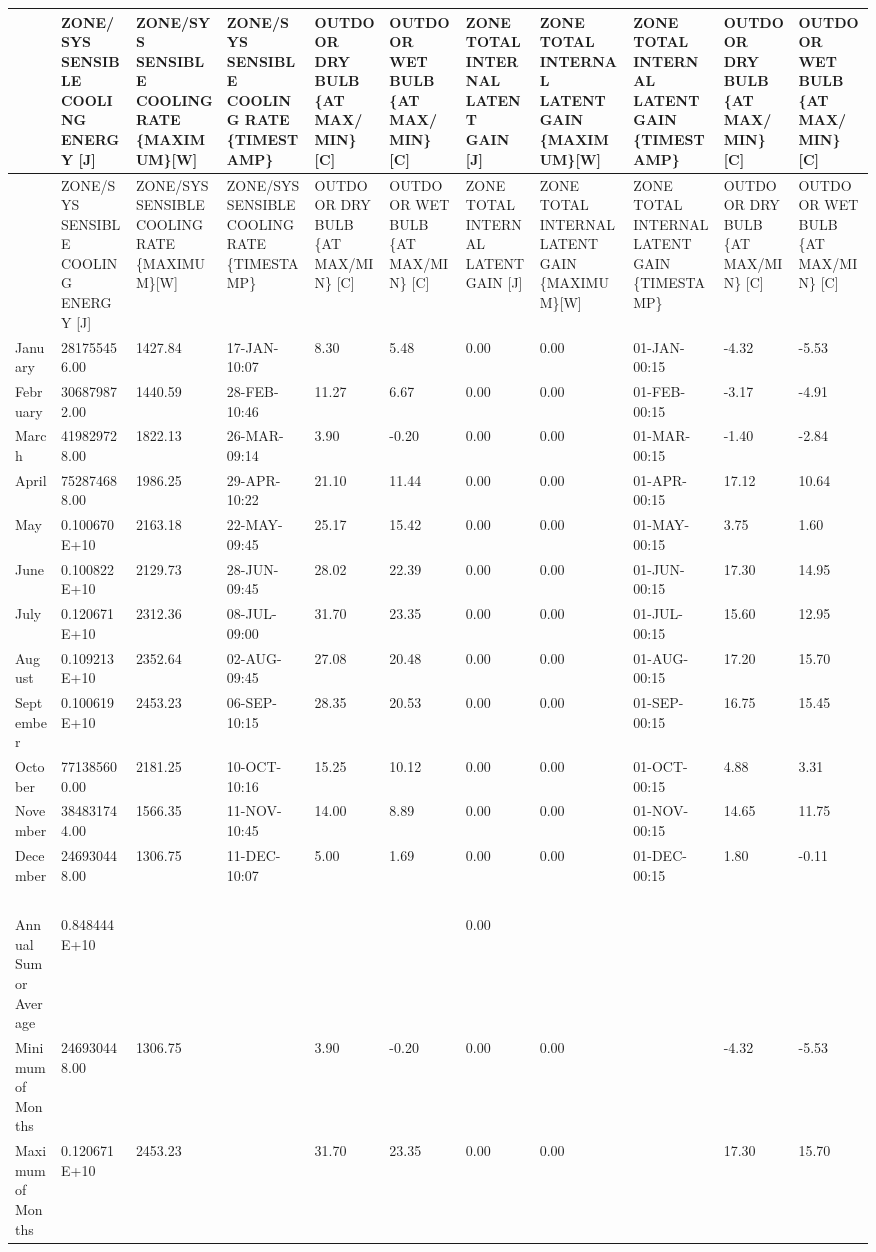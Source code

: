 {\tiny
\begin{longtable}[c]{>{\raggedright}p{0.54in}>{\raggedright}p{0.54in}>{\raggedright}p{0.54in}>{\raggedright}p{0.54in}>{\raggedright}p{0.54in}>{\raggedright}p{0.54in}>{\raggedright}p{0.54in}>{\raggedright}p{0.54in}>{\raggedright}p{0.54in}>{\raggedright}p{0.54in}>{\raggedright}p{0.54in}}
\toprule 
~ & ZONE/SYS SENSIBLE COOLING ENERGY [J] & ZONE/SYS SENSIBLE COOLING RATE \{MAXIMUM\}[W] & ZONE/SYS SENSIBLE COOLING RATE \{TIMESTAMP\} & OUTDOOR DRY BULB \{AT MAX/MIN\} [C] & OUTDOOR WET BULB \{AT MAX/MIN\} [C] & ZONE TOTAL INTERNAL LATENT GAIN [J] & ZONE TOTAL INTERNAL LATENT GAIN \{MAXIMUM\}[W] & ZONE TOTAL INTERNAL LATENT GAIN \{TIMESTAMP\} & OUTDOOR DRY BULB \{AT MAX/MIN\} [C] & OUTDOOR WET BULB \{AT MAX/MIN\} [C] \tabularnewline
\midrule
\endfirsthead

\toprule 
~ & ZONE/SYS SENSIBLE COOLING ENERGY [J] & ZONE/SYS SENSIBLE COOLING RATE \{MAXIMUM\}[W] & ZONE/SYS SENSIBLE COOLING RATE \{TIMESTAMP\} & OUTDOOR DRY BULB \{AT MAX/MIN\} [C] & OUTDOOR WET BULB \{AT MAX/MIN\} [C] & ZONE TOTAL INTERNAL LATENT GAIN [J] & ZONE TOTAL INTERNAL LATENT GAIN \{MAXIMUM\}[W] & ZONE TOTAL INTERNAL LATENT GAIN \{TIMESTAMP\} & OUTDOOR DRY BULB \{AT MAX/MIN\} [C] & OUTDOOR WET BULB \{AT MAX/MIN\} [C] \tabularnewline
\midrule
\endhead

January & 281755456.00 & 1427.84 & 17-JAN-10:07 & 8.30 & 5.48 & 0.00 & 0.00 & 01-JAN-00:15 & -4.32 & -5.53 \tabularnewline
February & 306879872.00 & 1440.59 & 28-FEB-10:46 & 11.27 & 6.67 & 0.00 & 0.00 & 01-FEB-00:15 & -3.17 & -4.91 \tabularnewline
March & 419829728.00 & 1822.13 & 26-MAR-09:14 & 3.90 & -0.20 & 0.00 & 0.00 & 01-MAR-00:15 & -1.40 & -2.84 \tabularnewline
April & 752874688.00 & 1986.25 & 29-APR-10:22 & 21.10 & 11.44 & 0.00 & 0.00 & 01-APR-00:15 & 17.12 & 10.64 \tabularnewline
May & 0.100670E+10 & 2163.18 & 22-MAY-09:45 & 25.17 & 15.42 & 0.00 & 0.00 & 01-MAY-00:15 & 3.75 & 1.60 \tabularnewline
June & 0.100822E+10 & 2129.73 & 28-JUN-09:45 & 28.02 & 22.39 & 0.00 & 0.00 & 01-JUN-00:15 & 17.30 & 14.95 \tabularnewline
July & 0.120671E+10 & 2312.36 & 08-JUL-09:00 & 31.70 & 23.35 & 0.00 & 0.00 & 01-JUL-00:15 & 15.60 & 12.95 \tabularnewline
August & 0.109213E+10 & 2352.64 & 02-AUG-09:45 & 27.08 & 20.48 & 0.00 & 0.00 & 01-AUG-00:15 & 17.20 & 15.70 \tabularnewline
September & 0.100619E+10 & 2453.23 & 06-SEP-10:15 & 28.35 & 20.53 & 0.00 & 0.00 & 01-SEP-00:15 & 16.75 & 15.45 \tabularnewline
October & 771385600.00 & 2181.25 & 10-OCT-10:16 & 15.25 & 10.12 & 0.00 & 0.00 & 01-OCT-00:15 & 4.88 & 3.31 \tabularnewline
November & 384831744.00 & 1566.35 & 11-NOV-10:45 & 14.00 & 8.89 & 0.00 & 0.00 & 01-NOV-00:15 & 14.65 & 11.75 \tabularnewline
December & 246930448.00 & 1306.75 & 11-DEC-10:07 & 5.00 & 1.69 & 0.00 & 0.00 & 01-DEC-00:15 & 1.80 & -0.11 \tabularnewline
~ & ~ & ~ & ~ & ~ & ~ & ~ & ~ & ~ & ~ & ~ \tabularnewline
Annual Sum or Average & 0.848444E+10 & ~ & ~ & ~ & ~ & 0.00 & ~ & ~ & ~ & ~ \tabularnewline
Minimum of Months & 246930448.00 & 1306.75 & ~ & 3.90 & -0.20 & 0.00 & 0.00 & ~ & -4.32 & -5.53 \tabularnewline
Maximum of Months & 0.120671E+10 & 2453.23 & ~ & 31.70 & 23.35 & 0.00 & 0.00 & ~ & 17.30 & 15.70 \tabularnewline
\bottomrule
\end{longtable}}

